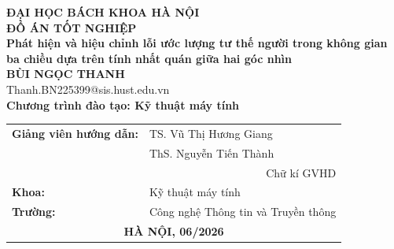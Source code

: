 \documentclass[DoAn.tex]{subfiles}
\begin{document}
\begin{titlepage}
\thispagestyle{empty}

\begin{center}

{\textbf{\large{ĐẠI HỌC BÁCH KHOA HÀ NỘI}}}\\[3cm]

{\textbf{\huge{ĐỒ ÁN TỐT NGHIỆP}}}\\[0.8cm]

{\textbf{\Large{Phát hiện và hiệu chỉnh lỗi ước lượng tư thế người trong không gian ba chiều dựa trên tính nhất quán giữa hai góc nhìn}}}\\[0.8cm]

{\textbf{\large{BÙI NGỌC THANH}}}\\
{\large{Thanh.BN225399@sis.hust.edu.vn}}\\[0.4cm]
{\textbf{\large{Chương trình đào tạo: Kỹ thuật máy tính}}}\\

\vspace{2.5cm}

\begin{table}[H]
\centering
\begin{tabular}{ll}
\multicolumn{1}{c}{\textbf{Giảng viên hướng dẫn:}}
& TS. Vũ Thị Hương Giang \hspace{0.5cm} \underline{\hspace{3cm}}  \\[0.5cm]

& ThS. Nguyễn Tiến Thành \hspace{0.5cm} \underline{\hspace{3cm}}  \\[0.5cm]

& \multicolumn{1}{r}{Chữ kí GVHD} \\[0.6cm]

\textbf{Khoa:} & Kỹ thuật máy tính \\[0.4cm]

\textbf{Trường:} & Công nghệ Thông tin và Truyền thông \\[2.5cm]

\multicolumn{2}{c}{\textbf{HÀ NỘI, 06/2026}}
\end{tabular}
\end{table}

\end{center}

\end{titlepage}
\end{document}
